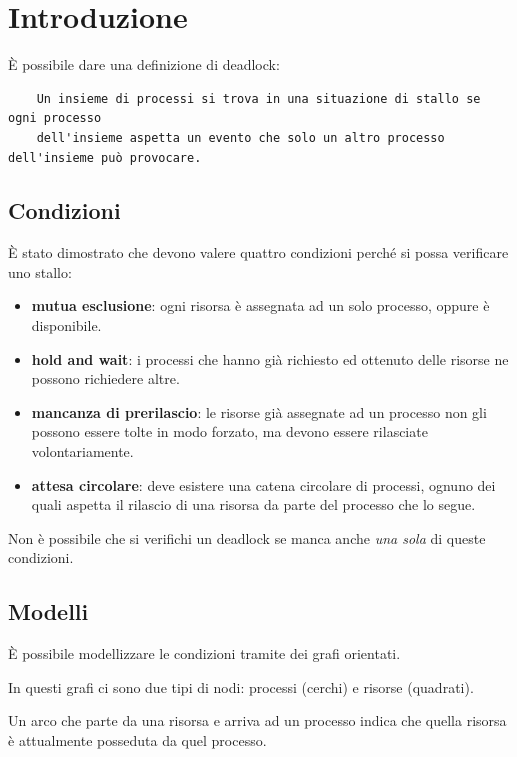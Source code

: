 \paragraph*{}
\section{Introduzione}
È possibile dare una definizione di deadlock:

\begin{verbatim}
    Un insieme di processi si trova in una situazione di stallo se ogni processo 
    dell'insieme aspetta un evento che solo un altro processo dell'insieme può provocare.
\end{verbatim}

\subsection{Condizioni}
È stato dimostrato che devono valere quattro condizioni perché si possa verificare uno stallo:
\begin{itemize}
    \item \textbf{mutua esclusione}: ogni risorsa è assegnata ad un solo processo, oppure è disponibile.
    \item \textbf{hold and wait}: i processi che hanno già richiesto ed ottenuto delle risorse ne possono richiedere altre.
    \item \textbf{mancanza di prerilascio}: le risorse già assegnate ad un processo non gli possono essere tolte in modo forzato, ma devono essere rilasciate volontariamente.
    \item \textbf{attesa circolare}: deve esistere una catena circolare di processi, ognuno dei quali aspetta il rilascio di una risorsa da parte del processo che lo segue.
\end{itemize}

Non è possibile che si verifichi un deadlock se manca anche \textit{una sola} di queste condizioni.

\subsection{Modelli}
È possibile modellizzare le condizioni tramite dei grafi orientati.

In questi grafi ci sono due tipi di nodi: processi (cerchi) e risorse (quadrati).

Un arco che parte da una risorsa e arriva ad un processo indica che quella risorsa è attualmente posseduta da quel processo.

